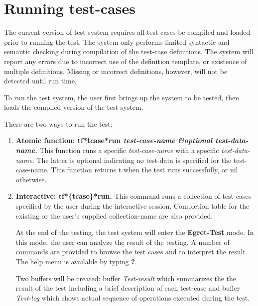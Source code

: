 \section {Running test-cases}

The current version of  test system requires all test-cases 
be compiled and loaded prior to running the test. The system
only performs limited syntactic and semantic checking during 
compilation of the test-case definitions.  The system will report
any errors due to incorrect use of the definition template,
or existence of multiple definitions.  Missing or incorrect
definitions, however, will not be detected until run time.

\noindent To run the test system, the user first brings up the system
to be tested, then loads the compiled version of the 
test system.

\noindent There are two ways to run the test:
\begin {enumerate}

\item {\bf Atomic function: tf*tcase*run {\it test-case-name} {\it \&optional test-data-name.}}
This function runs a specific {\it test-case-name} with a specific
{\it test-data-name}.  The latter is optional indicating no test-data
is specified for the  test-case-name.
This function returns t when the test runs successfully, or nil otherwise.

\item {\bf Interactive: tf*\{tcase\}*run.}
This command runs a collection of test-cases specified by the
user during the interactive session.  Completion table for the existing
or the user's supplied collection-name are also provided.  

At the end of the testing, the test system will enter the 
{\bf Egret-Test} mode.
In this mode, the user can analyze the result of the testing. A number
of commands are provided to browse the test cases and to interpret the
result. The help menu is available by typing {\bf ?}.

Two buffers will be created: buffer {\it Test-result} which summarizes the
the result of the test including a brief description of each test-case
and buffer {\it Test-log} which shows actual sequence of operations
executed  during the test. 
\end {enumerate}


